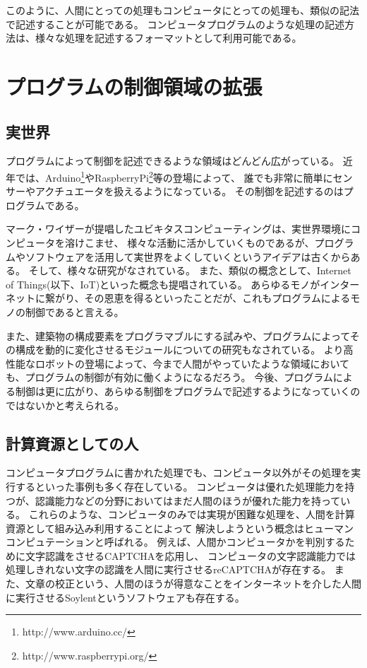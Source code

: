 このように、人間にとっての処理もコンピュータにとっての処理も、類似の記法で記述することが可能である。
コンピュータプログラムのような処理の記述方法は、様々な処理を記述するフォーマットとして利用可能である。

\section{プログラムの制御領域の拡張}\label{ux30d7ux30edux30b0ux30e9ux30e0ux306eux5236ux5fa1ux9818ux57dfux306eux62e1ux5f35}

\subsection{実世界}\label{ux5b9fux4e16ux754c}

プログラムによって制御を記述できるような領域はどんどん広がっている。
近年では、Arduino\footnote{http://www.arduino.cc/}やRaspberryPi\footnote{http://www.raspberrypi.org/}等の登場によって、
誰でも非常に簡単にセンサーやアクチュエータを扱えるようになっている。
その制御を記述するのはプログラムである。

マーク・ワイザーが提唱したユビキタスコンピューティング\cite{weiser1991computer}は、実世界環境にコンピュータを溶けこませ、
様々な活動に活かしていくものであるが、プログラムやソフトウェアを活用して実世界をよくしていくというアイデアは古くからある。
そして、様々な研究がなされている。 また、類似の概念として、Internet of
Things(以下、IoT)\cite{iot}といった概念も提唱されている。
あらゆるモノがインターネットに繋がり、その恩恵を得るといったことだが、これもプログラムによるモノの制御であると言える。

また、建築物の構成要素をプログラマブルにする試み\cite{squama}や、プログラムによってその構成を動的に変化させるモジュールについての研究もなされている。
より高性能なロボットの登場によって、今まで人間がやっていたような領域においても、プログラムの制御が有効に働くようになるだろう。
今後、プログラムによる制御は更に広がり、あらゆる制御をプログラムで記述するようになっていくのではないかと考えられる。

\subsection{計算資源としての人}\label{ux8a08ux7b97ux8cc7ux6e90ux3068ux3057ux3066ux306eux4eba}

コンピュータプログラムに書かれた処理でも、コンピュータ以外がその処理を実行するといった事例も多く存在している。
コンピュータは優れた処理能力を持つが、認識能力などの分野においてはまだ人間のほうが優れた能力を持っている。
これらのような、コンピュータのみでは実現が困難な処理を、人間を計算資源として組み込み利用することによって
解決しようという概念はヒューマンコンピュテーション\cite{humancomputation}と呼ばれる。
例えば、人間かコンピュータかを判別するために文字認識をさせるCAPTCHA\cite{captcha}を応用し、
コンピュータの文字認識能力では処理しきれない文字の認識を人間に実行させるreCAPTCHA\cite{recaptcha}が存在する。
また、文章の校正という、人間のほうが得意なことをインターネットを介した人間に実行させるSoylent\cite{soylent}というソフトウェアも存在する。

